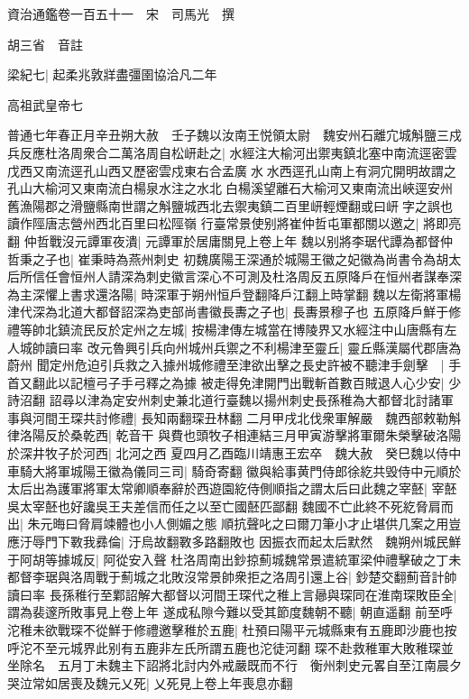 資治通鑑卷一百五十一　宋　司馬光　撰

胡三省　音註

梁紀七|{
	起柔兆敦牂盡彊圉協洽凡二年}


高祖武皇帝七

普通七年春正月辛丑朔大赦　壬子魏以汝南王悦領太尉　魏安州石離宂城斛鹽三戍兵反應杜洛周衆合二萬洛周自松岍赴之|{
	水經注大榆河出禦夷鎮北塞中南流逕密雲戊西又南流逕孔山西又歷密雲戍東右合孟廣水水西逕孔山南上有洞宂開明故謂之孔山大榆河又東南流白楊泉水注之水北白楊溪望離石大榆河又東南流出峽逕安州舊漁陽郡之滑鹽縣南世謂之斛鹽城西北去禦夷鎮二百里岍輕煙翻或曰岍字之誤也讀作陘唐志營州西北百里曰松陘嶺}
行臺常景使别將崔仲哲屯軍都關以邀之|{
	將即亮翻}
仲哲戰沒元譚軍夜潰|{
	元譚軍於居庸關見上卷上年}
魏以别將李琚代譚為都督仲哲秉之子也|{
	崔秉時為燕州刺史}
初魏廣陽王深通於城陽王徽之妃徽為尚書令為胡太后所信任會恒州人請深為刺史徽言深心不可測及杜洛周反五原降戶在恒州者謀奉深為主深懼上書求還洛陽|{
	時深軍于朔州恒戶登翻降戶江翻上時掌翻}
魏以左衛將軍楊津代深為北道大都督詔深為吏部尚書徽長夀之子也|{
	長夀景穆子也}
五原降戶鮮于修禮等帥北鎮流民反於定州之左城|{
	按楊津傳左城當在博陵界又水經注中山唐縣有左人城帥讀曰率}
改元魯興引兵向州城州兵禦之不利楊津至靈丘|{
	靈丘縣漢屬代郡唐為蔚州}
聞定州危迫引兵救之入據州城修禮至津欲出擊之長史許被不聽津手劍擊　|{
	手首又翻此以記檀弓子手弓釋之為據}
被走得免津開門出戰斬首數百賊退人心少安|{
	少詩沼翻}
詔尋以津為定安州刺史兼北道行臺魏以揚州刺史長孫稚為大都督北討諸軍事與河間王琛共討修禮|{
	長知兩翻琛丑林翻}
二月甲戌北伐衆軍解嚴　魏西部敕勒斛律洛陽反於桑乾西|{
	乾音干}
與費也頭牧子相連結三月甲寅游擊將軍爾朱榮擊破洛陽於深井牧子於河西|{
	北河之西}
夏四月乙酉臨川靖惠王宏卒　魏大赦　癸巳魏以侍中車騎大將軍城陽王徽為儀同三司|{
	騎奇寄翻}
徽與給事黄門侍郎徐紇共毁侍中元順於太后出為護軍將軍太常卿順奉辭於西遊園紇侍側順指之謂太后曰此魏之宰噽|{
	宰噽吳太宰噽也好讒吳王夫差信而任之以至亡國噽匹鄙翻}
魏國不亡此終不死紇脅肩而出|{
	朱元晦曰脅肩竦體也小人側媚之態}
順抗聲叱之曰爾刀筆小才止堪供几案之用豈應汙辱門下斁我彞倫|{
	汙烏故翻斁多路翻敗也}
因振衣而起太后默然　魏朔州城民鮮于阿胡等據城反|{
	阿從安入聲}
杜洛周南出鈔掠薊城魏常景遣統軍梁仲禮擊破之丁未都督李琚與洛周戰于薊城之北敗沒常景帥衆拒之洛周引還上谷|{
	鈔楚交翻薊音計帥讀曰率}
長孫稚行至鄴詔解大都督以河間王琛代之稚上言曏與琛同在淮南琛敗臣全|{
	謂為裴邃所敗事見上卷上年}
遂成私隙今難以受其節度魏朝不聽|{
	朝直遥翻}
前至呼沱稚未欲戰琛不從鮮于修禮邀擊稚於五鹿|{
	杜預曰陽平元城縣東有五鹿即沙鹿也按呼沱不至元城界此别有五鹿非左氏所謂五鹿也沱徒河翻}
琛不赴救稚軍大敗稚琛並坐除名　五月丁未魏主下詔將北討内外戒嚴既而不行　衡州刺史元畧自至江南晨夕哭泣常如居喪及魏元乂死|{
	乂死見上卷上年喪息亦翻}
